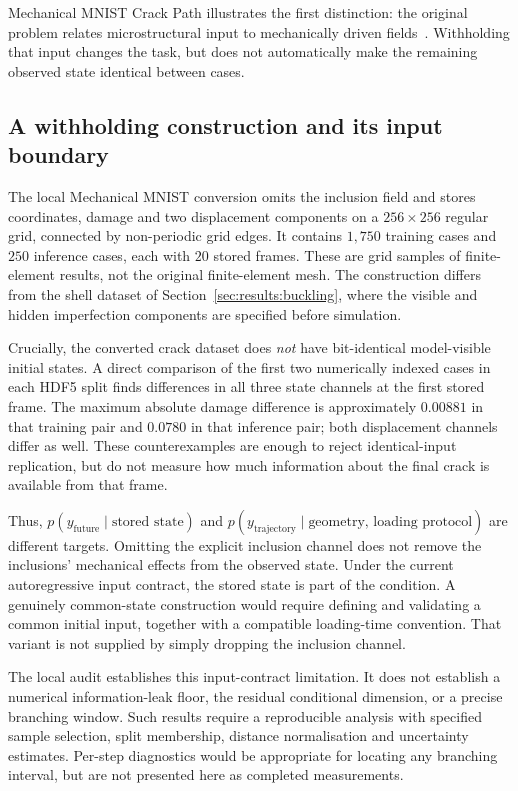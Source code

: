Mechanical MNIST Crack Path illustrates the first distinction: the original
problem relates microstructural input to mechanically driven
fields~\cite{mohammadzadeh2022crackpath}. Withholding that input changes the
task, but does not automatically make the remaining observed state identical
between cases.

\subsection{A withholding construction and its input boundary}
\label{sec:bench:construction}

The local Mechanical MNIST conversion omits the inclusion field and stores
coordinates, damage and two displacement components on a $256\times256$
regular grid, connected by non-periodic grid edges. It contains $1{,}750$
training cases and $250$ inference cases, each with $20$ stored frames. These
are grid samples of finite-element results, not the original finite-element
mesh. The construction differs from the shell dataset of
Section~\ref{sec:results:buckling}, where the visible and hidden imperfection
components are specified before simulation.

Crucially, the converted crack dataset does \emph{not} have bit-identical
model-visible initial states. A direct comparison of the first two numerically
indexed cases in each HDF5 split finds differences in all three state channels
at the first stored frame. The maximum absolute damage difference is
approximately $0.00881$ in that training pair and $0.0780$ in that inference
pair; both displacement channels differ as well. These counterexamples are
enough to reject identical-input replication, but do not measure how much
information about the final crack is available from that frame.

Thus, $p(y_{\mathrm{future}}\mid \text{stored state})$ and
$p(y_{\mathrm{trajectory}}\mid \text{geometry, loading protocol})$ are
different targets. Omitting the explicit inclusion channel does not remove the
inclusions' mechanical effects from the observed state. Under the current
autoregressive input contract, the stored state is part of the condition.
A genuinely common-state construction would require defining and validating a
common initial input, together with a compatible loading-time convention.
That variant is not supplied by simply dropping the inclusion channel.

The local audit establishes this input-contract limitation. It does not
establish a numerical information-leak floor, the residual conditional
dimension, or a precise branching window. Such results require a reproducible
analysis with specified sample selection, split membership, distance
normalisation and uncertainty estimates. Per-step diagnostics would be
appropriate for locating any branching interval, but are not presented here
as completed measurements.

